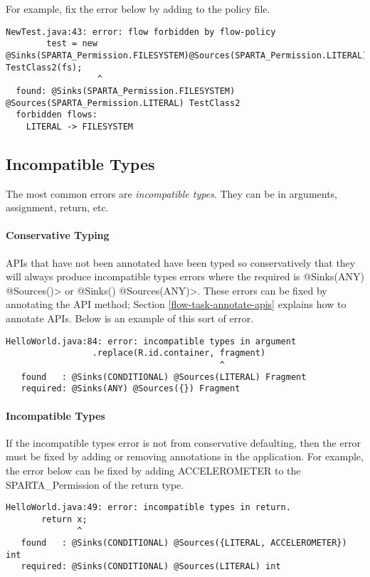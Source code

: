 For example, fix the error below by adding  to the policy file.
\begin{Verbatim}
NewTest.java:43: error: flow forbidden by flow-policy  
        test = new @Sinks(SPARTA_Permission.FILESYSTEM)@Sources(SPARTA_Permission.LITERAL) TestClass2(fs);
                  ^
  found: @Sinks(SPARTA_Permission.FILESYSTEM) @Sources(SPARTA_Permission.LITERAL) TestClass2 
  forbidden flows:
    LITERAL -> FILESYSTEM
\end{Verbatim}

\subsection{Incompatible Types}
The most common errors are \emph{incompatible types}.  They can be in arguments,  assignment, return, etc.

\paragraph{Conservative Typing}

APIs that have not been annotated have been typed so conservatively that they will always produce incompatible types errors where the required is \<@Sinks(ANY) @Sources({})> or 
\<@Sinks({}) @Sources(ANY)>.  These errors can be fixed by annotating the API method; 
Section \ref{flow-task-annotate-apis} explains how to annotate APIs. 
Below is an example of this sort of error.

\begin{Verbatim}
HelloWorld.java:84: error: incompatible types in argument
                 .replace(R.id.container, fragment)
                                          ^
   found   : @Sinks(CONDITIONAL) @Sources(LITERAL) Fragment
   required: @Sinks(ANY) @Sources({}) Fragment
\end{Verbatim}

\paragraph{Incompatible Types}

If the incompatible types error is not from conservative defaulting, then the error must be fixed by adding or
removing annotations in the application.  For example, the error below can be fixed by adding ACCELEROMETER to the SPARTA_Permission of the return type.  

\begin{Verbatim}
HelloWorld.java:49: error: incompatible types in return.
       return x;
              ^
   found   : @Sinks(CONDITIONAL) @Sources({LITERAL, ACCELEROMETER}) int
   required: @Sinks(CONDITIONAL) @Sources(LITERAL) int
\end{Verbatim}

